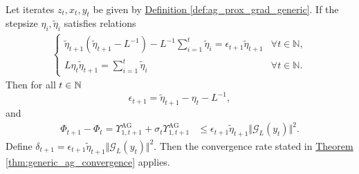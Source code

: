 \documentclass[12pt]{article}
\begin{document}
    \begin{theorem}
    \label{thm:ag_generic_stepsize_constraints}\;\\
        Let iterates $z_t, x_t, y_t$ be given by
        \hyperref[def:ag_prox_grad_generic]
        {Definition \ref*{def:ag_prox_grad_generic}}. 
        If the stepsize $\eta_i, \tilde \eta_i$ satisfies relations 
        \begin{align*}
            \begin{cases}
                \tilde \eta_{t + 1} (\tilde \eta_{t + 1} - L^{-1})
                - L^{-1} \sum_{i= 1}^{t}\tilde \eta_i 
                = 
                \epsilon_{t + 1} \tilde \eta_{t + 1}
                & \forall t \in \mathbb N, 
                \\
                L \eta_t \tilde \eta_{t + 1} = \sum_{i=1}^{t}\tilde \eta_i 
                & \forall t \in \mathbb N. 
            \end{cases}
        \end{align*}
        Then for all $t \in \mathbb N$
        $$
            \epsilon_{t + 1} = \tilde \eta_{t + 1} - \eta_t - L^{-1}, 
        $$
        and 
        \begin{align*}
            \Phi_{t + 1} - \Phi_t =
            \Upsilon_{1, t + 1}^\text{AG} + 
            \sigma_t\Upsilon_{1, t + 1}^{\text{AG}}
            &\le
            \epsilon_{t + 1}\tilde\eta_{t + 1} \Vert \mathcal G_L(y_t)\Vert^2.
        \end{align*}
        Define $\delta_{t + 1} = \epsilon_{t + 1}\tilde\eta_{t + 1} \Vert \mathcal G_L(y_t)\Vert^2$. 
        Then the convergence rate stated in 
        \hyperref[thm:generic_ag_convergence]
        {Theorem \ref*{thm:generic_ag_convergence}}
        applies. 
    \end{theorem}
\end{document}
